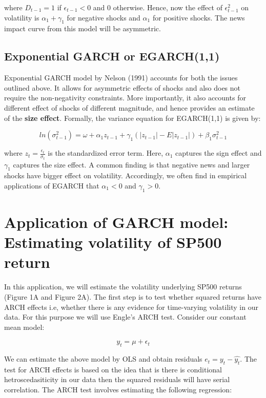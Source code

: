 \documentclass[]{book}
\theoremstyle{definition}
\theoremstyle{definition}
\theoremstyle{definition}
\theoremstyle{remark}
\begin{document}
where \(D_{t-1}=1\) if \(\epsilon_{t-1}<0\) and \(0\) otherwise. Hence,
now the effect of \(\epsilon^2_{t-1}\) on volatility is
\(\alpha_1+\gamma_1\) for negative shocks and \(\alpha_1\) for positive
shocks. The news impact curve from this model will be asymmetric.

\hypertarget{exponential-garch-or-egarch11}{%
\subsection{Exponential GARCH or
EGARCH(1,1)}\label{exponential-garch-or-egarch11}}

Exponential GARCH model by Nelson (1991) accounts for both the issues
outlined above. It allows for asymmetric effects of shocks and also does
not require the non-negativity constraints. More importantly, it also
accounts for different effect of shocks of different magnitude, and
hence provides an estimate of the \textbf{size effect}. Formally, the
variance equation for EGARCH(1,1) is given by:

\[ln(\sigma^2_{t-1})=\omega+ \alpha_1 z_{t-1} +\gamma_1 (|z_{t-1}|-E|z_{t-1}|) +\beta_1\sigma^2_{t-1}\]

where \(z_t=\frac{\epsilon_t}{\sigma_t}\) is the standardized error
term. Here, \(\alpha_1\) captures the sign effect and \(\gamma_1\)
captures the size effect. A common finding is that negative news and
larger shocks have bigger effect on volatility. Accordingly, we often
find in empirical applications of EGARCH that \(\alpha_1<0\) and
\(\gamma_1>0\).

\hypertarget{application-of-garch-model-estimating-volatility-of-sp500-return}{%
\section{Application of GARCH model: Estimating volatility of SP500
return}\label{application-of-garch-model-estimating-volatility-of-sp500-return}}

In this application, we will estimate the volatility underlying SP500
returns (Figure 1A and Figure 2A). The first step is to test whether
squared returns have ARCH effects i.e, whether there is any evidence for
time-varying volatility in our data. For this purpose we will use
Engle's ARCH test. Consider our constant mean model:

\[y_t=\mu +\epsilon_t\]

We can estimate the above model by OLS and obtain residuals
\(e_t=y_t-\hat{y_t}\). The test for ARCH effects is based on the idea
that is there is conditional hetroscedasiticity in our data then the
squared residuals will have serial correlation. The ARCH test involves
estimating the following regression:
\end{document}
